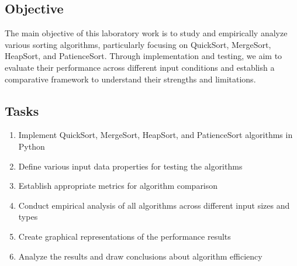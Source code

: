 \documentclass[a4paper,12pt]{article}
\begin{document}
\subsection{Objective}
\label{sec:orga6be145}
The main objective of this laboratory work is to study and empirically analyze various sorting algorithms, particularly focusing on QuickSort, MergeSort, HeapSort, and PatienceSort. Through implementation and testing, we aim to evaluate their performance across different input conditions and establish a comparative framework to understand their strengths and limitations.
\subsection{Tasks}
\label{sec:orgf8b49de}
\begin{enumerate}
\item Implement QuickSort, MergeSort, HeapSort, and PatienceSort algorithms in Python
\item Define various input data properties for testing the algorithms
\item Establish appropriate metrics for algorithm comparison
\item Conduct empirical analysis of all algorithms across different input sizes and types
\item Create graphical representations of the performance results
\item Analyze the results and draw conclusions about algorithm efficiency
\end{enumerate}
\end{document}
